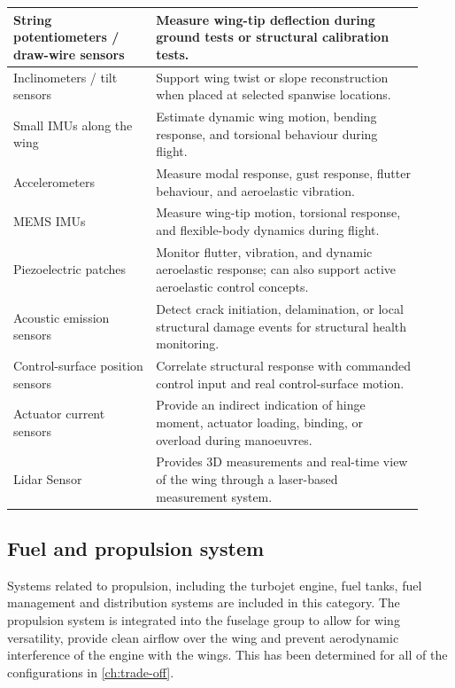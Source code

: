 \begin{longtable}{|p{0.32\linewidth}|p{0.60\linewidth}|}
String potentiometers / draw-wire sensors 
& Measure wing-tip deflection during ground tests or structural calibration tests. \\
\hline

Inclinometers / tilt sensors 
& Support wing twist or slope reconstruction when placed at selected spanwise locations. \\
\hline

Small IMUs along the wing 
& Estimate dynamic wing motion, bending response, and torsional behaviour during flight. \\
\hline

Accelerometers 
& Measure modal response, gust response, flutter behaviour, and aeroelastic vibration. \\
\hline

MEMS IMUs 
& Measure wing-tip motion, torsional response, and flexible-body dynamics during flight. \\
\hline

Piezoelectric patches 
& Monitor flutter, vibration, and dynamic aeroelastic response; can also support active aeroelastic control concepts. \\
\hline

Acoustic emission sensors 
& Detect crack initiation, delamination, or local structural damage events for structural health monitoring. \\
\hline

Control-surface position sensors 
& Correlate structural response with commanded control input and real control-surface motion. \\
\hline

Actuator current sensors 
& Provide an indirect indication of hinge moment, actuator loading, binding, or overload during manoeuvres. \\
\hline

Lidar Sensor
& Provides 3D measurements and real-time view of the wing through a laser-based measurement system. \\
\hline

\end{longtable}



\subsection{Fuel and propulsion system}
\label{subsec:fuel_systems}
Systems related to propulsion, including the turbojet engine, fuel tanks, fuel management and distribution systems are included in this category. The propulsion system is integrated into the fuselage group to allow for wing versatility, provide clean airflow over the wing and prevent aerodynamic interference of the engine with the wings. This has been determined for all of the configurations in \autoref{ch:trade-off}.

